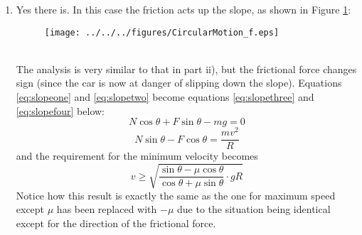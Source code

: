 \begin{problem}
{\begin{enumerate}
\begin{enumerate}
\begin{equation} \label{eq:slopeone} N\cos\theta-F\sin\theta-mg=0 \end{equation}
and
\begin{equation} \label{eq:slopetwo} N\sin\theta+F\cos\theta=\frac{mv^2}{R} \end{equation}
Substituting $F=\mu N$ in equation \eqref{eq:slopeone} gives
\begin{align*}
N\cos\theta-\mu N\sin\theta&=mg \\
\Rightarrow \frac{N\cos\theta-\mu N\sin\theta}{g}&=m
\end{align*}
then substituting in $F=\mu N$ and for $m$ (using the expression above) in equation \eqref{eq:slopetwo} we find
\begin{equation*} N\sin\theta+\mu N\cos\theta=\frac{\left(N\cos\theta-\mu N\sin\theta\right)v^2}{gR} \end{equation*} 
\begin{equation*} \Rightarrow v^2=\frac{\sin\theta+\mu \cos\theta}{\cos\theta-\mu \sin\theta}\cdot gR \end{equation*}
So now in order not to slip up the slope
\begin{equation*} v\le\sqrt{\frac{\sin\theta+\mu \cos\theta}{\cos\theta-\mu \sin\theta}\cdot gR} \end{equation*}
Notice how in the case $\theta=0$ this expression simplifies to the answer from part a), and similarly if $\mu=0$ the answer from part b) i).
\\
\item Yes there is. In this case the friction acts up the slope, as shown in Figure \ref{fig:CircularMotion_f}:
\begin{figure}[ht]
\centering
\texttt{[image: ../../../figures/CircularMotion\_f.eps]}
\caption{}
\label{fig:CircularMotion_f}
\end{figure}
\\
The analysis is very similar to that in part ii), but the frictional force changes sign (since the car is now at danger of slipping down the slope). Equations \eqref{eq:slopeone} and \eqref{eq:slopetwo} become equations \eqref{eq:slopethree} and \eqref{eq:slopefour} below:
\begin{equation}
 N\cos\theta+F\sin\theta-mg=0
\label{eq:slopethree}
\end{equation}
\begin{equation} 
N\sin\theta-F\cos\theta=\frac{mv^2}{R}
\label{eq:slopefour}
\end{equation}
and the requirement for the minimum velocity becomes
\begin{equation*}
v\ge\sqrt{\frac{\sin\theta-\mu \cos\theta}{\cos\theta+\mu \sin\theta}\cdot gR}
\end{equation*}
Notice how this result is exactly the same as the one for maximum speed except $\mu$ has been replaced with $-\mu$ due to the situation being identical except for the direction of the frictional force. 
\end{enumerate}
\end{enumerate}
}
\end{problem}